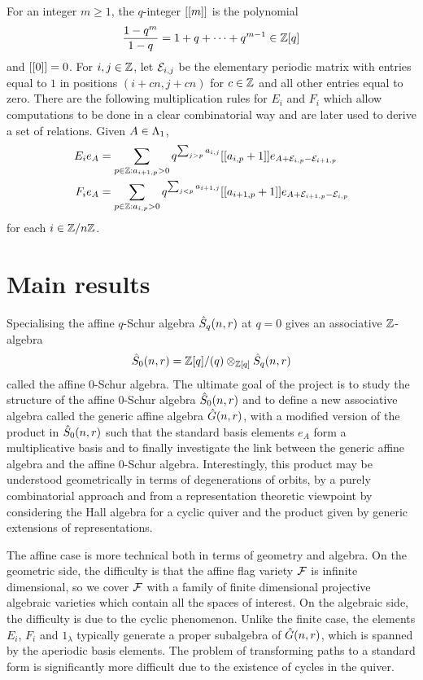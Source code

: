 \documentclass[a4paper, 11pt, twoside]{report}
\begin{document}
For an integer $m\geq 1$, the $q$-integer $[[m]]$ is the polynomial
\begin{equation*}
\frac{1-q^m}{1-q} = 1 + q +\cdots + q^{m-1}\in\mathbb{Z}[q]
\end{equation*}
and $[[0]]=0$. For $i,j\in\mathbb{Z}$, let $\mathcal{E}_{i,j}$ be the elementary periodic matrix with entries equal to $1$ in positions $(i+cn,j+cn)$ for $c\in\mathbb{Z}$ and all other entries equal to zero. There are the following multiplication rules for $E_i$ and $F_i$ which allow computations to be done in a clear combinatorial way and are later used to derive a set of relations. Given $A\in\Lambda_1{}$,
\begin{align*}
E_ie_A &= \sum_{p\in\mathbb{Z}:a_{i+1,p}>0} q^{\sum_{j>p}a_{i,j}} [[a_{i,p}+1]] e_{A+\mathcal{E}_{i,p} -\mathcal{E}_{i+1,p}}\\
F_ie_A &= \sum_{p\in\mathbb{Z}:a_{i,p}>0} q^{\sum_{j<p}a_{i+1,j}} [[a_{i+1,p}+1]] e_{A+\mathcal{E}_{i+1,p} -\mathcal{E}_{i,p}}
\end{align*}
for each $i\in\mathbb{Z}/{n \mathbb{Z}}$.


\section{Main results}

Specialising the affine $q$-Schur algebra $\hat{S}_q(n,r)$ at $q=0$ gives an associative $\mathbb{Z}$-algebra
\begin{equation*}
\hat{S}_0(n,r) = \mathbb{Z}[q]/{(q)}\otimes_{\mathbb{Z}[q]}\hat{S}_q(n,r)
\end{equation*}
called the affine $0$-Schur algebra. The ultimate goal of the project is to study the structure of the affine $0$-Schur algebra $\hat{S}_0(n,r)$ and to define a new associative algebra called the generic affine algebra $\hat{G}(n,r)$, with a modified version of the product in $\hat{S}_0(n,r)$ such that the standard basis elements $e_A$ form a multiplicative basis and to finally investigate the link between the generic affine algebra and the affine $0$-Schur algebra. Interestingly, this product may be understood geometrically in terms of degenerations of orbits, by a purely combinatorial approach and from a representation theoretic viewpoint by considering the Hall algebra for a cyclic quiver and the product given by generic extensions of representations.

The affine case is more technical both in terms of geometry and algebra. On the geometric side, the difficulty is that the affine flag variety $\mathcal{F}$ is infinite dimensional, so we cover $\mathcal{F}$ with a family of finite dimensional projective algebraic varieties which contain all the spaces of interest. On the algebraic side, the difficulty is due to the cyclic phenomenon. Unlike the finite case, the elements $E_i$, $F_i$ and $1_\lambda$ typically generate a proper subalgebra of $\hat{G}(n,r)$, which is spanned by the aperiodic basis elements. The problem of transforming paths to a standard form is significantly more difficult due to the existence of cycles in the quiver.
\end{document}
